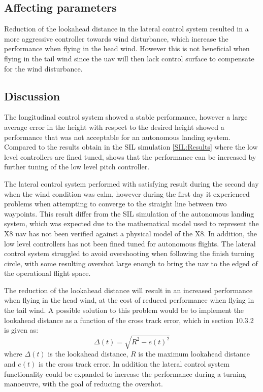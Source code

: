 \subsection{Affecting parameters}
Reduction of the lookahead distance in the lateral control system resulted in a more aggressive controller towards wind disturbance, which increase the performance when flying in the head wind. However this is not beneficial when flying in the tail wind since the \gls{uav} will then lack control surface to compensate for the wind disturbance.
\subsection{Discussion}
The longitudinal control system showed a stable performance, however a large average error in the height with respect to the desired height showed a performance that was not acceptable for an autonomous landing system. Compared to the results obtain in the SIL simulation \ref{SIL:Results} where the low level controllers are fined tuned, shows that the performance can be increased by further tuning of the low level pitch controller.

The lateral control system performed with satisfying result during the second day when the wind condition was calm, however during the first day it experienced problems when attempting to converge to the straight line between two waypoints. This result differ from the SIL simulation of the autonomous landing system, which was expected due to the mathematical model used to represent the X8 \gls{uav} has not been verified against a physical model of the X8. In addition, the low level controllers has not been fined tuned for autonomous flights. The lateral control system  struggled to avoid overshooting when following the finish turning circle, with some resulting overshot large enough to bring the \gls{uav} to the edged of the operational flight space.

The reduction of the lookahead distance will result in an increased performance when flying in the head wind, at the cost of reduced performance when flying in the tail wind. A possible solution to this problem would be to implement the lookahead distance as a function of the cross track error, which in \citep{fossen2011handbook} section 10.3.2 is given as:
\begin{equation}
\Delta(t) = \sqrt{R^2 - e(t)^2}
\end{equation}
where $\Delta(t)$ is the lookahead distance, $R$ is the maximum lookahead distance and $e(t)$ is the cross track error. In addition the lateral control system functionality could be expanded to increase the performance during a turning manoeuvre, with the goal of reducing the overshot.
